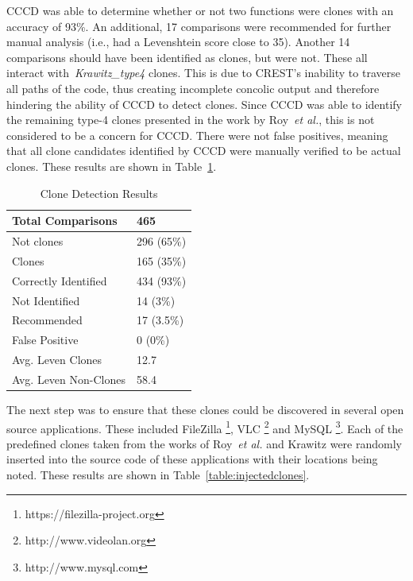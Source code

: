\documentclass[conference]{IEEEtran}
\begin{document}
CCCD was able to determine whether or not two functions were clones with an accuracy of 93\%. An additional, 17 comparisons were recommended for further manual analysis (i.e., had a Levenshtein score close to 35). Another 14 comparisons should have been identified as clones, but were not. These all interact with~\emph{Krawitz\_type4} clones. This is due to CREST's inability to traverse all paths of the code, thus creating incomplete concolic output and therefore hindering the ability of CCCD to detect clones. Since CCCD was able to identify the remaining type-4 clones presented in the work by Roy~\emph{et al.}, this is not considered to be a concern for CCCD. There were not false positives, meaning that all clone candidates identified by CCCD were manually verified to be actual clones. These results are shown in Table~\ref{table:completeKrawresults}.



\begin{table}[thb!]
\begin{center}
\caption{Clone Detection Results}
    \begin{tabular}{ l | l }
    \toprule
 	Total Comparisons & 465 \\ \hline
	Not clones & 296 (65\%) \\ \hline
	Clones & 165  (35\%)  \\ \hline
	Correctly Identified & 434 (93\%) \\ \hline
	Not Identified & 14  (3\%) \\ \hline
	Recommended & 17  (3.5\%) \\ \hline
	False Positive & 0  (0\%) \\ \hline
	Avg. Leven Clones & 12.7 \\ \hline
	Avg. Leven Non-Clones & 58.4 \\ \bottomrule

    \end{tabular}
    
\label{table:completeKrawresults}
    \vspace{-0.2in}
\end{center}



\end{table}

The next step was to ensure that these clones could be discovered in several open source applications. These included FileZilla \footnote{https://filezilla-project.org}, VLC \footnote{http://www.videolan.org} and MySQL \footnote{http://www.mysql.com}. Each of the predefined clones taken from the works of Roy~\emph{et al.} and Krawitz were randomly inserted into the source code of these applications with their locations being noted. These results are shown in Table~\ref{table:injectedclones}.
\end{document}
